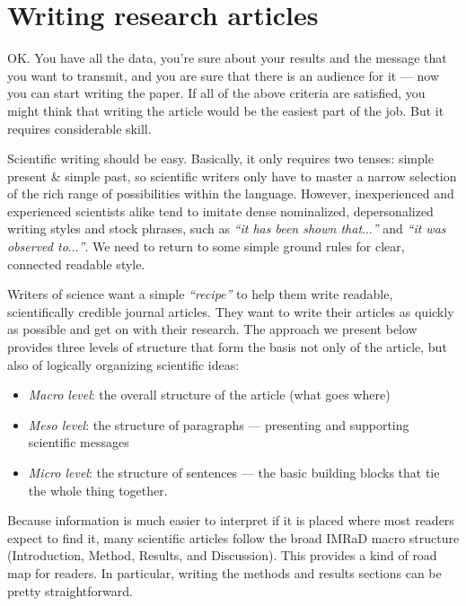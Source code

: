 \documentclass[graybox,envcountchap,sectrefs,UStrade]{svmono}
\begin{document}

 \chapter{Writing research articles}\label{sec:structures}

OK. You have all the data, you're sure about your results and the message that you want to transmit, and you are sure that there is an audience for it --- now you can start writing the paper. If all of the above criteria are satisfied, you might think that writing the article would be the easiest part of the job. But it requires considerable skill.\par

Scientific writing should be easy. Basically, it only requires two tenses: simple present \& simple past, so scientific writers only have to master a narrow selection of the rich range of possibilities within the language. However, inexperienced and experienced scientists alike tend to imitate dense nominalized, depersonalized writing styles and stock phrases, such as \emph{``it has been shown that$\ldots$''} and \emph{``it was observed to$\ldots$''}. We need to return to some simple ground rules for clear, connected readable style.\par

Writers of science want a simple \emph{``recipe''} to help them write readable, scientifically credible journal articles. They want to write their articles as quickly as possible and get on with their research. The approach we present below provides three levels of structure that form the basis not only of the article, but also of logically organizing scientific ideas:

\begin{itemize}
  \item \emph{Macro level}: the overall structure of the article (what goes where)
  \item \emph{Meso level}: the structure of paragraphs --- presenting and supporting scientific messages
  \item \emph{Micro level}: the structure of sentences --- the basic building blocks that tie the whole thing together.
\end{itemize}

Because information is much easier to interpret if it is placed where most readers expect to find it, many scientific articles follow the broad IMRaD macro structure (Introduction, Method, Results, and Discussion). This provides a kind of road map for readers. In particular, writing the methods and results sections can be pretty straightforward.\par
\end{document}
